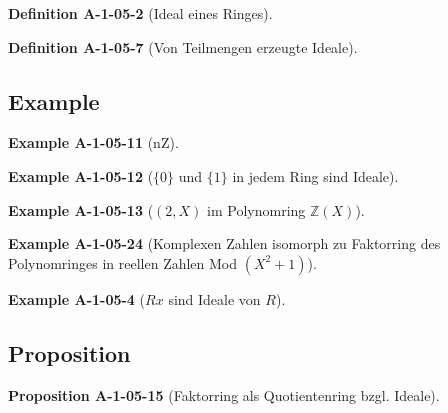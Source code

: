 \documentclass[10pt, letterpaper]{article}
\newcommand{\CustomHeading}[3]{%
  \par\medskip\noindent%
  \textbf{#1 #2} \textnormal{(#3)}.\enskip%
}
\newenvironment{DEF}[2]{\CustomHeading{Definition}{#1}{#2}}{}
\newenvironment{PROP}[2]{\CustomHeading{Proposition}{#1}{#2}}{}
\newenvironment{EXA}[2]{\CustomHeading{Example}{#1}{#2}}{}
\begin{document}
\begin{DEF}{A-1-05-2}{Ideal eines Ringes}

\end{DEF}

\begin{DEF}{A-1-05-7}{Von Teilmengen erzeugte Ideale}

\end{DEF}









\subsection{Example}



\begin{EXA}{A-1-05-11}{nZ}

\end{EXA}

\begin{EXA}{A-1-05-12}{$\{0\}$ und $\{1\}$ in jedem Ring sind Ideale}

\end{EXA}

\begin{EXA}{A-1-05-13}{$(2,X)$ im Polynomring $\mathbb{Z}(X)$}

\end{EXA}

\begin{EXA}{A-1-05-24}{Komplexen Zahlen isomorph zu Faktorring des Polynomringes in reellen Zahlen Mod $(X^2+1)$}

\end{EXA}

\begin{EXA}{A-1-05-4}{$Rx$ sind Ideale von $R$}

\end{EXA}













\subsection{Proposition}



\begin{PROP}{A-1-05-15}{Faktorring als Quotientenring bzgl. Ideale}

\end{PROP}
\end{document}

